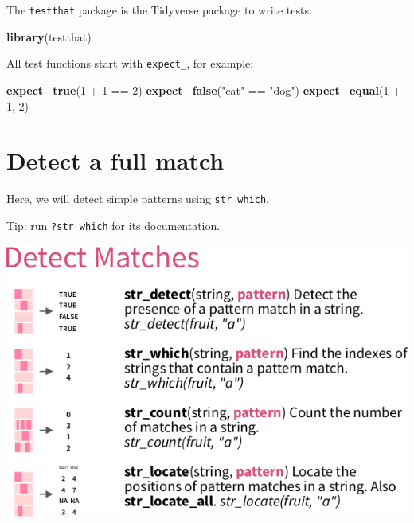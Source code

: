 \documentclass[]{book}
\newenvironment{Shaded}{}{}
\newcommand{\DecValTok}[1]{\textcolor[rgb]{0.25,0.63,0.44}{#1}}
\newcommand{\KeywordTok}[1]{\textcolor[rgb]{0.00,0.44,0.13}{\textbf{#1}}}
\newcommand{\NormalTok}[1]{#1}
\newcommand{\OperatorTok}[1]{\textcolor[rgb]{0.40,0.40,0.40}{#1}}
\newcommand{\StringTok}[1]{\textcolor[rgb]{0.25,0.44,0.63}{#1}}
\begin{document}
The \texttt{testthat} package is the Tidyverse package to write tests.

\begin{Shaded}
\begin{Highlighting}[]
\KeywordTok{library}\NormalTok{(testthat)}
\end{Highlighting}
\end{Shaded}

All test functions start with \texttt{expect\_}, for example:

\begin{Shaded}
\begin{Highlighting}[]
\KeywordTok{expect_true}\NormalTok{(}\DecValTok{1} \OperatorTok{+}\StringTok{ }\DecValTok{1} \OperatorTok{==}\StringTok{ }\DecValTok{2}\NormalTok{)}
\KeywordTok{expect_false}\NormalTok{(}\StringTok{"cat"} \OperatorTok{==}\StringTok{ "dog"}\NormalTok{)}
\KeywordTok{expect_equal}\NormalTok{(}\DecValTok{1} \OperatorTok{+}\StringTok{ }\DecValTok{1}\NormalTok{, }\DecValTok{2}\NormalTok{)}
\end{Highlighting}
\end{Shaded}

\hypertarget{detect-a-full-match}{%
\chapter{Detect a full match}\label{detect-a-full-match}}

Here, we will detect simple patterns using \texttt{str\_which}.

Tip: run \texttt{?str\_which} for its documentation.

\includegraphics{06_detect.png}
\end{document}
